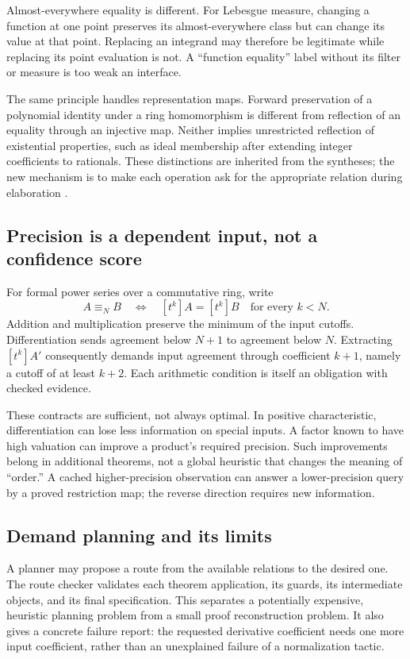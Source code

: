 \documentclass[11pt,a4paper]{article}
\theoremstyle{plain}\newtheorem{proposition}{Proposition}[section]
\theoremstyle{definition}\newtheorem{definition}[proposition]{Definition}
\theoremstyle{remark}\newtheorem{remark}[proposition]{Remark}
\begin{document}
Almost-everywhere equality is different. For Lebesgue measure, changing a function at one point preserves its almost-everywhere class but can change its value at that point. Replacing an integrand may therefore be legitimate while replacing its point evaluation is not. A ``function equality'' label without its filter or measure is too weak an interface.

The same principle handles representation maps. Forward preservation of a polynomial identity under a ring homomorphism is different from reflection of an equality through an injective map. Neither implies unrestricted reflection of existential properties, such as ideal membership after extending integer coefficients to rationals. These distinctions are inherited from the syntheses; the new mechanism is to make each operation ask for the appropriate relation during elaboration \cite{synA,synB}.

\subsection{Precision is a dependent input, not a confidence score}
For formal power series over a commutative ring, write
\[
 A\equiv_N B\quad\Longleftrightarrow\quad
 [t^k]A=[t^k]B\quad\text{for every }k<N.
\]
Addition and multiplication preserve the minimum of the input cutoffs. Differentiation sends agreement below \(N+1\) to agreement below \(N\). Extracting \([t^k]A'\) consequently demands input agreement through coefficient \(k+1\), namely a cutoff of at least \(k+2\). Each arithmetic condition is itself an obligation with checked evidence.

These contracts are sufficient, not always optimal. In positive characteristic, differentiation can lose less information on special inputs. A factor known to have high valuation can improve a product's required precision. Such improvements belong in additional theorems, not a global heuristic that changes the meaning of ``order.'' A cached higher-precision observation can answer a lower-precision query by a proved restriction map; the reverse direction requires new information.

\subsection{Demand planning and its limits}
A planner may propose a route from the available relations to the desired one. The route checker validates each theorem application, its guards, its intermediate objects, and its final specification. This separates a potentially expensive, heuristic planning problem from a small proof reconstruction problem. It also gives a concrete failure report: the requested derivative coefficient needs one more input coefficient, rather than an unexplained failure of a normalization tactic.
\end{document}
